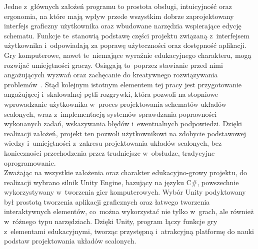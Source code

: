 \vspace*{0.1cm}

\indent Jedne z~głównych założeń programu to prostota obsługi, intuicyjność oraz ergonomia,
na które mają wpływ przede wszystkim dobrze zaprojektowany interfejs graficzny użytkownika
oraz wbudowane narzędzia wspierające edycję schematu.
Funkcje te~stanowią podstawę części projektu związaną z~interfejsem użytkownika
i~odpowiadają za poprawę użyteczności
oraz dostępność aplikacji.\\
\indent Gry komputerowe, nawet te~niemające wyraźnie edukacyjnego charakteru,
mogą rozwijać umiejętności graczy.
Osiągają to~poprzez stawianie przed nimi angażujących wyzwań
oraz zachęcanie do kreatywnego rozwiązywania problemów~\cite{videogames}.
Stąd kolejnym istotnym elementem tej pracy jest przygotowanie angażującej
i~skalowalnej pętli rozgrywki,
która pozwoli na stopniowe wprowadzanie użytkownika w~proces projektowania schematów układów scalonych,
wraz z~implementacją systemów sprawdzania poprawności wykonanych zadań, wskazywania błędów i~ewentualnych podpowiedzi.
Dzięki realizacji założeń, projekt ten pozwoli użytkownikowi na zdobycie podstawowej wiedzy
i~umiejętności z~zakresu projektowania układów scalonych,
bez konieczności przechodzenia przez trudniejsze w~obsłudze, tradycyjne oprogramowanie.\\
\indent Zważając na wszystkie założenia oraz charakter edukacyjno-growy projektu,
do realizacji wybrano silnik Unity Engine,
bazujący na języku C\#,
powszechnie wykorzystywany w~tworzenia gier komputerowych.
Wybór Unity podyktowany był prostotą tworzenia aplikacji graficznych oraz łatwego tworzenia interaktywnych elementów,
co~można wykorzystać nie tylko w~grach, ale również w~różnego typu narzędziach.
Dzięki Unity,
program łączy funkcje gry z~elementami edukacyjnymi,
tworząc przystępną i~atrakcyjną platformę do nauki podstaw projektowania układów scalonych.
